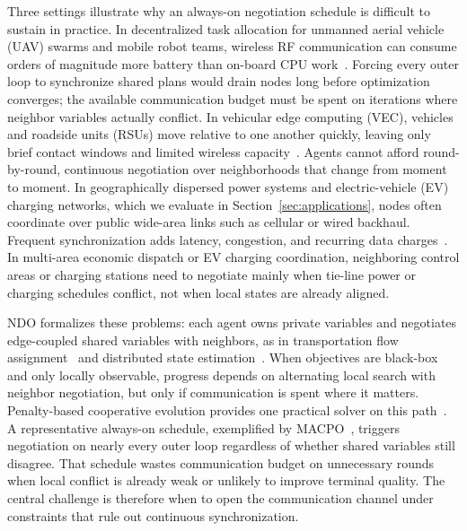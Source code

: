 \documentclass[conference]{IEEEtran}
\begin{document}
Three settings illustrate why an always-on negotiation schedule is difficult to sustain in practice. In decentralized task allocation for unmanned aerial vehicle (UAV) swarms and mobile robot teams, wireless RF communication can consume orders of magnitude more battery than on-board CPU work~\cite{ref_dopt_robotics_2024}. Forcing every outer loop to synchronize shared plans would drain nodes long before optimization converges; the available communication budget must be spent on iterations where neighbor variables actually conflict. In vehicular edge computing (VEC), vehicles and roadside units (RSUs) move relative to one another quickly, leaving only brief contact windows and limited wireless capacity~\cite{ref_dopt_iov_2024}. Agents cannot afford round-by-round, continuous negotiation over neighborhoods that change from moment to moment. In geographically dispersed power systems and electric-vehicle (EV) charging networks, which we evaluate in Section~\ref{sec:applications}, nodes often coordinate over public wide-area links such as cellular or wired backhaul. Frequent synchronization adds latency, congestion, and recurring data charges~\cite{ref_ndo_dispatch_2024,ref_dopt_smartgrid_2024}. In multi-area economic dispatch or EV charging coordination, neighboring control areas or charging stations need to negotiate mainly when tie-line power or charging schedules conflict, not when local states are already aligned.

NDO formalizes these problems: each agent owns private variables and negotiates edge-coupled shared variables with neighbors, as in transportation flow assignment~\cite{ref_ndo_traffic_2022} and distributed state estimation~\cite{ref_ndo_stateest_2024}. When objectives are black-box and only locally observable, progress depends on alternating local search with neighbor negotiation, but only if communication is spent where it matters. Penalty-based cooperative evolution provides one practical solver on this path~\cite{ref_potter_dejong,ref_cc_dist_accel_2024,ref_masoie_2024,ref_maes_ccsa_2025}. A representative always-on schedule, exemplified by MACPO~\cite{ref_macpo}, triggers negotiation on nearly every outer loop regardless of whether shared variables still disagree. That schedule wastes communication budget on unnecessary rounds when local conflict is already weak or unlikely to improve terminal quality. The central challenge is therefore when to open the communication channel under constraints that rule out continuous synchronization.
\end{document}
